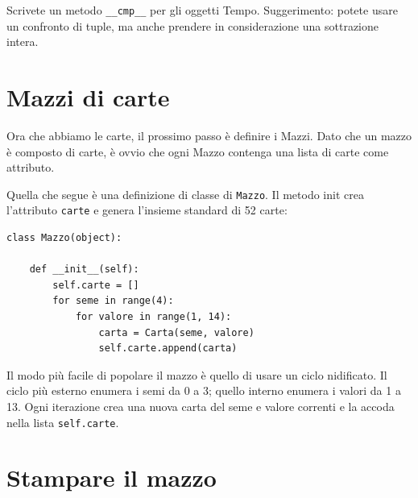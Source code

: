 \documentclass[10pt]{book}
\begin{document}
\vspace{0.2in}
\begin{exercise}

Scrivete un metodo \verb"__cmp__" per gli oggetti Tempo. Suggerimento: potete usare un confronto di tuple, ma anche prendere in considerazione una sottrazione intera.



\end{exercise}


\section{Mazzi di carte}

Ora che abbiamo le carte, il prossimo passo è definire i Mazzi. Dato che un mazzo è composto di carte, è ovvio che ogni Mazzo contenga una lista di carte come attributo.

Quella che segue è una definizione di classe di {\tt Mazzo}.  Il metodo init crea l'attributo {\tt carte} e genera l'insieme standard di 52 carte:

\begin{verbatim}
class Mazzo(object):

    def __init__(self):
        self.carte = []
        for seme in range(4):
            for valore in range(1, 14):
                carta = Carta(seme, valore)
                self.carte.append(carta)
\end{verbatim}
%
Il modo più facile di popolare il mazzo è quello di usare un ciclo nidificato. Il ciclo più esterno enumera i semi da 0 a 3; quello interno enumera i valori da 1 a 13. Ogni iterazione crea una nuova carta del seme e valore correnti e la accoda nella lista  {\tt self.carte}.


\section{Stampare il mazzo}
\label{printdeck}
\end{document}
